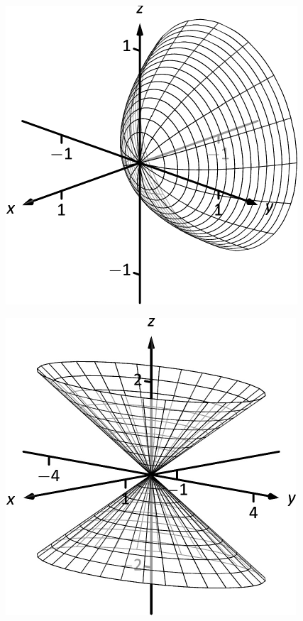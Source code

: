 \documentclass[10pt]{article}
\begin{document}
\includegraphics{fig10_01_ex_23_3DBW.pdf}
\texttt{}

\includegraphics{fig10_01_ex_24_3DBW.pdf}
\texttt{}
\end{document}
